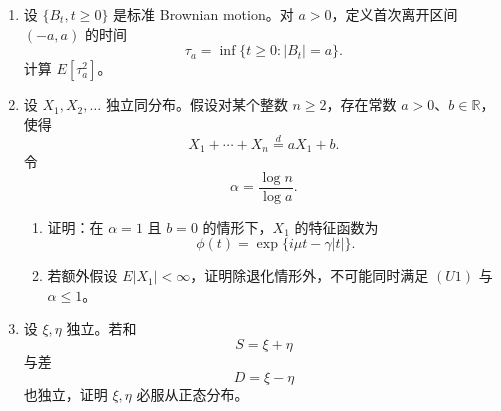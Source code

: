 \documentclass[UTF8,12pt]{ctexart}
\begin{document}
\begin{enumerate}[label=\textbf{\arabic*.},leftmargin=2.2em]
\item 设 \(\{B_t,t\ge0\}\) 是标准 Brownian motion。对 \(a>0\)，定义首次离开区间 \((-a,a)\) 的时间
\[
\tau_a=\inf\{t\ge0:|B_t|=a\}.
\]
计算 \(E[\tau_a^2]\)。

\item 设 \(X_1,X_2,\ldots\) 独立同分布。假设对某个整数 \(n\ge2\)，存在常数 \(a>0\)、\(b\in\mathbb R\)，使得
\[
X_1+\cdots+X_n\stackrel d= aX_1+b. \tag{U1}
\]
令
\[
\alpha=\frac{\log n}{\log a}.
\]
\begin{enumerate}[label=\textbf{(\alph*)},leftmargin=2.4em]
\item 证明：在 \(\alpha=1\) 且 \(b=0\) 的情形下，\(X_1\) 的特征函数为
\[
\phi(t)=\exp\{i\mu t-\gamma |t|\}.
\]
\item 若额外假设 \(E|X_1|<\infty\)，证明除退化情形外，不可能同时满足 \((U1)\) 与 \(\alpha\le1\)。
\end{enumerate}

\item 设 \(\xi,\eta\) 独立。若和
\[
S=\xi+\eta
\]
与差
\[
D=\xi-\eta
\]
也独立，证明 \(\xi,\eta\) 必服从正态分布。
\end{enumerate}
\end{document}
